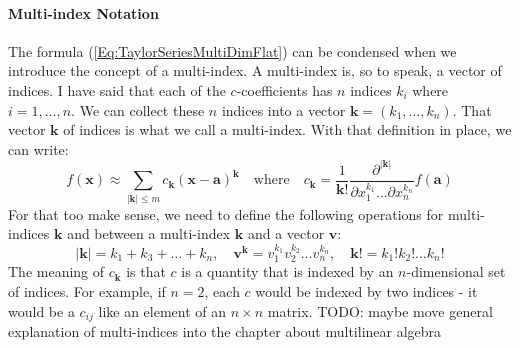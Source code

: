 \paragraph{Multi-index Notation}
The formula (\ref{Eq:TaylorSeriesMultiDimFlat}) can be condensed when we introduce the concept of a multi-index. A multi-index is, so to speak, a vector of indices. I have said that each of the $c$-coefficients has $n$ indices $k_i$ where $i = 1,\ldots,n$. We can collect these $n$ indices into a vector $\mathbf{k} = (k_1,\ldots,k_n)$. That vector $\mathbf{k}$ of indices is what we call a multi-index. With that definition in place, we can write:
\begin{equation}
 f(\mathbf{x}) \approx
 \sum_{|\mathbf{k}| \leq m} c_{\mathbf{k}} (\mathbf{x-a})^{\mathbf{k}} 
 \quad \text{where} \quad
 c_{\mathbf{k}} = \frac{1}{\mathbf{k!} } 
                      \frac{ \partial^{|\mathbf{k}|}}
                           { \partial x_1 ^{k_1} \ldots \partial x_n ^ {k_n}} f(\mathbf{a})
\end{equation}
For that too make sense, we need to define the following operations for multi-indices $\mathbf{k}$ and between a multi-index $\mathbf{k}$ and a vector $\mathbf{v}$:
\begin{equation}
|\mathbf{k}| = k_1 + k_3 + \ldots + k_n, \quad
\mathbf{v}^{\mathbf{k}} = v_1^{k_1} v_2^{k_2} \ldots v_n^{k_n}, \quad
\mathbf{k}! = k_1! k_2! \ldots k_n!
\end{equation}
The meaning of $c_{\mathbf{k}}$ is that $c$ is a quantity that is indexed by an $n$-dimensional set of indices. For example, if $n=2$, each $c$ would be indexed by two indices - it would be a $c_{ij}$ like an element of an $n \times n$ matrix. TODO: maybe move general explanation of multi-indices into the chapter about multilinear algebra



